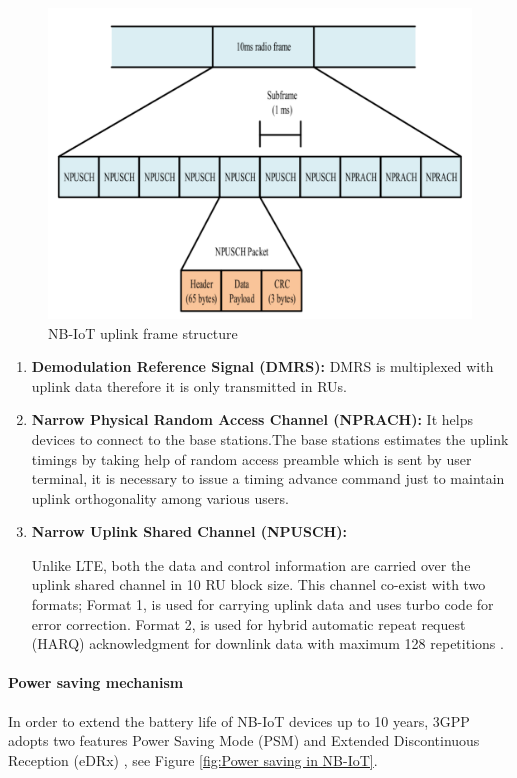 \documentclass[12pt]{article}
\begin{document}
 \begin{figure}[!h]
     \centering
     \includegraphics[width=0.9\columnwidth]{Images/nbiotUplinkFrame.pdf}
     \caption{NB-IoT uplink frame structure \cite{malik2018radio}}
     \label{fig:NB-IoT uplink frame structure}
 \end{figure}
 
 \begin{enumerate}
     \item \textbf{Demodulation Reference Signal (DMRS):} DMRS is multiplexed with uplink data therefore it is only transmitted in RUs.
     \item \textbf{Narrow Physical Random Access Channel (NPRACH):} It helps devices to connect to the base stations.The base stations estimates the uplink timings by taking help of random access preamble which is sent by user terminal, it is necessary to issue a timing advance command just to maintain uplink orthogonality among various users.  
     \item \textbf{Narrow Uplink Shared Channel (NPUSCH):} 
     
      Unlike LTE, both the data and control information are carried over the uplink shared channel in 10 RU block size. This channel co-exist with two formats; Format 1, is used for carrying uplink data and uses turbo code for error correction. Format 2, is used for hybrid automatic repeat request (HARQ) acknowledgment for downlink data with maximum 128 repetitions \cite{malik2018radio}.
    
 \end{enumerate}
 
\paragraph{Power saving mechanism}
In order to extend the battery life of NB-IoT devices up to 10 years, 3GPP adopts two features Power Saving Mode (PSM) and Extended Discontinuous Reception (eDRx) , see Figure \ref{fig:Power saving in NB-IoT}.\par
\end{document}
